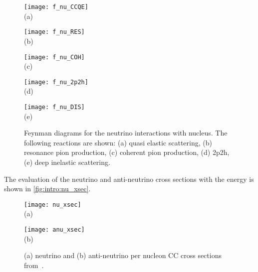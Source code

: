 \documentclass[../main.tex]{subfiles}
\begin{document}
\begin{figure}[!ht]
  \centering
  \begin{minipage}{0.29\linewidth}
    \centering
    \texttt{[image: f\_nu\_CCQE]} \\ (a)
  \end{minipage}
  \begin{minipage}{0.29\linewidth}
    \centering
    \texttt{[image: f\_nu\_RES]} \\ (b)
  \end{minipage}
  \begin{minipage}{0.29\linewidth}
    \centering
    \texttt{[image: f\_nu\_COH]} \\ (c)
  \end{minipage}
  \vfill
  \begin{minipage}{0.29\linewidth}
    \centering
    \texttt{[image: f\_nu\_2p2h]} \\ (d)
  \end{minipage}
  \begin{minipage}{0.29\linewidth}
    \centering
    \texttt{[image: f\_nu\_DIS]} \\ (e)
  \end{minipage}
  \caption{Feynman diagrams for the neutrino interactions with nucleus. The following reactions are shown: (a) quasi elastic scattering, (b) resonance pion production, (c) coherent pion production, (d) 2p2h, (e) deep inelastic scattering.}
  \label{fig:intro:f_nu_nucl}
\end{figure}

The evaluation of the neutrino and anti-neutrino cross sections with the energy is shown in \autoref{fig:intro:nu_xsec}.

\begin{figure}[!ht]
  \centering
  \begin{minipage}{0.49\linewidth}
    \centering
    \texttt{[image: nu\_xsec]} \\ (a)
  \end{minipage}
  \begin{minipage}{0.49\linewidth}
    \centering
    \texttt{[image: anu\_xsec]} \\ (b)
  \end{minipage}
  \caption{(a) neutrino and (b) anti-neutrino per nucleon CC cross sections from~\cite{formaggio2012ev}.}
  \label{fig:intro:nu_xsec}
\end{figure}
\end{document}
